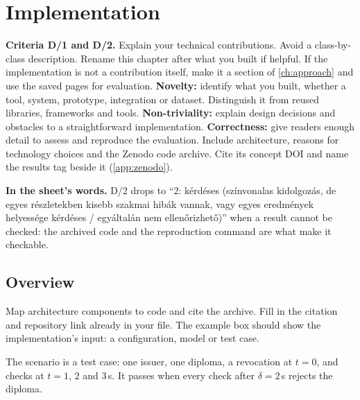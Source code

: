 \section{Implementation}\label{app:chapters:implementation}
\textbf{Criteria D/1 and D/2.} Explain your technical contributions. Avoid a class-by-class description. Rename this chapter after what you built if helpful. If the implementation is not a contribution itself, make it a section of \cref{ch:approach} and use the saved pages for evaluation.
\textbf{Novelty:} identify what you built, whether a tool, system, prototype, integration or dataset. Distinguish it from reused libraries, frameworks and tools.
\textbf{Non-triviality:} explain design decisions and obstacles to a straightforward implementation.
\textbf{Correctness:} give readers enough detail to assess and reproduce the evaluation. Include architecture, reasons for technology choices and the Zenodo code archive. Cite its concept DOI and name the results tag beside it (\cref{app:zenodo}).

\textbf{In the sheet's words.} D/2 drops to \enquote{2: kérdéses (színvonalas kidolgozás, de egyes részletekben kisebb szakmai hibák vannak, vagy egyes eredmények helyessége kérdéses / egyáltalán nem ellenőrizhető)} when a result cannot be checked: the archived code and the reproduction command are what make it checkable.

\subsection[Overview]{Overview\skimmark}\label{app:chapters:impl-overview}
Map architecture components to code and cite the archive. Fill in the citation and repository link already in your file. The example box should show the implementation's input: a configuration, model or test case.
\begin{runningexample}[as input]
The scenario is a test case: one issuer, one diploma, a revocation at $t = 0$, and checks at $t = 1$, $2$ and $3$\,s. It passes when every check after $\delta = 2$\,s rejects the diploma.
\end{runningexample}

